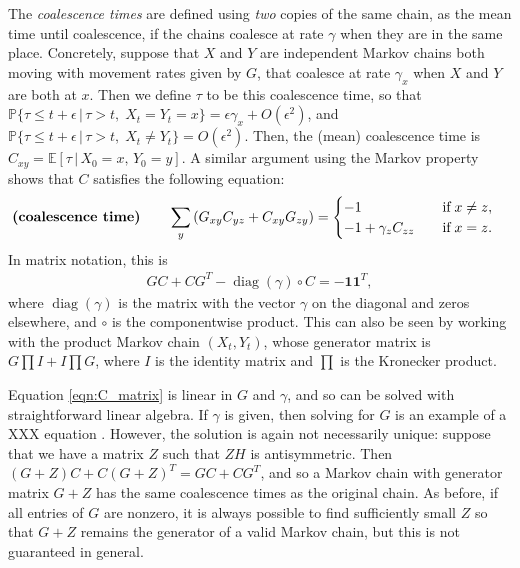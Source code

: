 \documentclass{article}
\DeclareMathOperator{\diag}{\mathop{\mbox{diag}}}
\renewcommand{\P}{\mathbb{P}}
\newcommand{\E}{\mathbb{E}}
\newcommand{\given}{\,\vert\,}
\newcommand{\bone}{\mathbf{1}}
\begin{document}
The \emph{coalescence times} are defined using \emph{two} copies of the same chain,
as the mean time until coalescence,
if the chains coalesce at rate $\gamma$ when they are in the same place.
Concretely, 
suppose that $X$ and $Y$ are independent Markov chains both moving with movement rates given by $G$,
that coalesce at rate $\gamma_x$ when $X$ and $Y$ are both at $x$.
Then we define $\tau$ to be this coalescence time,
so that 
$\P\{\tau \le t + \epsilon \given \tau > t, \; X_t = Y_t = x\} = \epsilon \gamma_x + O(\epsilon^2)$,
and 
$\P\{\tau \le t + \epsilon \given \tau > t, \; X_t \neq Y_t\} = O(\epsilon^2)$.
Then, the (mean) coalescence time is $C_{xy} = \E[\tau \given X_0 = x, \, Y_0 = y]$.
A similar argument using the Markov property
shows that $C$ satisfies the following equation:
\begin{align}
\text{\bf (coalescence time)} \qquad
    \sum_y \left(G_{xy} C_{yz} + C_{xy} G_{zy}\right)
    &=
    \begin{cases}
        -1                   \quad & \text{if} \; x \neq z, \\
        -1 + \gamma_z C_{zz} \quad & \text{if} \; x = z.
    \end{cases}
\end{align}
In matrix notation, this is
\begin{align} \label{eqn:C_matrix}
    G C + C G^T - \diag(\gamma) \circ C = -\bone \bone^T,
\end{align}
where $\diag(\gamma)$ is the matrix with the vector $\gamma$ on the diagonal and zeros elsewhere,
and $\circ$ is the componentwise product.
This can also be seen by working with the product Markov chain $(X_t, Y_t)$,
whose generator matrix is $G \prod I + I \prod G$,
where $I$ is the identity matrix and $\prod$ is the Kronecker product.

Equation \eqref{eqn:C_matrix} is linear in $G$ and $\gamma$,
and so can be solved with straightforward linear algebra.
If $\gamma$ is given, then solving for $G$ is an example of a XXX equation \citep{matrixeqn}.
However, the solution is again not necessarily unique:
suppose that we have a matrix $Z$ such that $ZH$ is antisymmetric.
Then $(G + Z) C + C (G + Z)^T = GC + CG^T$,
and so a Markov chain with generator matrix $G + Z$ has the same coalescence times
as the original chain.
As before, if all entries of $G$ are nonzero, 
it is always possible to find sufficiently small $Z$
so that $G + Z$ remains the generator of a valid Markov chain,
but this is not guaranteed in general.
\end{document}
